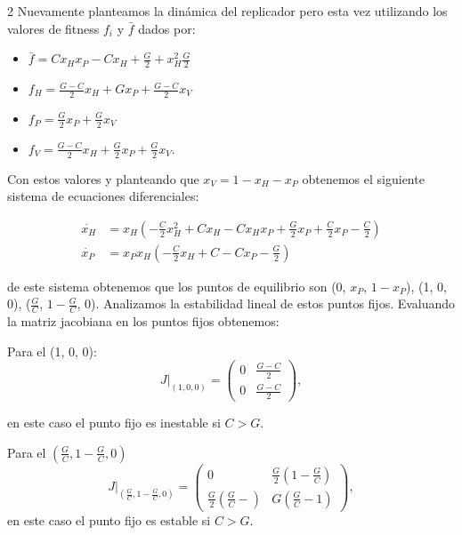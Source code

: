 \documentclass[spanish, 12pt, a4paper]{article}
\begin{document}
\begin{multicols}{2}
Nuevamente planteamos la dinámica del replicador pero esta vez utilizando los valores de fitness $f_i$ y $\bar{f}$ dados por:
\begin{itemize}
    \item $\bar{f} = C x_H x_P - C x_H + \frac{G}{2} + x_H^2 \frac{G}{2}$
    \item $f_H = \frac{G - C}{2} x_H + G x_P + \frac{G - C}{2} x_V$
    \item $f_P = \frac{G}{2} x_P + \frac{G}{2} x_V$
    \item $f_V = \frac{G - C}{2} x_H + \frac{G}{2} x_P + \frac{G}{2} x_V$.
\end{itemize}

Con estos valores y planteando que $x_V = 1 - x_H - x_P$ obtenemos el siguiente sistema de ecuaciones diferenciales:

\scriptsize
\begin{align}
    \dot{x_H} &= x_H \left( -\frac{C}{2} x_H^2 + C x_H - C x_H x_P + \frac{G}{2} x_P + \frac{C}{2} x_P - \frac{C}{2} \right)\\
    \dot{x_P} &= x_P x_H \left( - \frac{C}{2} x_H + C - C x_P - \frac{G}{2} \right)
\end{align}

\normalsize
de este sistema obtenemos que los puntos de equilibrio son (0, $x_P$, $1 - x_P$), (1, 0, 0), ($\frac{G}{C}$, $1 - \frac{G}{C}$, 0).
Analizamos la estabilidad lineal de estos puntos fijos. Evaluando la matriz jacobiana en los puntos fijos obtenemos:

Para el (1, 0, 0):
\begin{equation*}
    J|_{(1, 0, 0)} = \begin{pmatrix}
        0 & \frac{G - C}{2} \\
        0 & \frac{G - C}{2}
    \end{pmatrix},
\end{equation*}

en este caso el punto fijo es inestable si $C > G$.

Para el $\left(\frac{G}{C}, 1 - \frac{G}{C}, 0\right)$
\begin{equation*}
    J|_{\left(\frac{G}{C}, 1 - \frac{G}{C}, 0\right)} = \begin{pmatrix}
        0 & \frac{G}{2} \left( 1 - \frac{G}{C}\right) \\
        \frac{G}{2} \left(\frac{G}{C} - \right) & G \left(\frac{G}{C} - 1\right)
    \end{pmatrix},
\end{equation*}
en este caso el punto fijo es estable si $C > G$.


\end{multicols}
\end{document}
